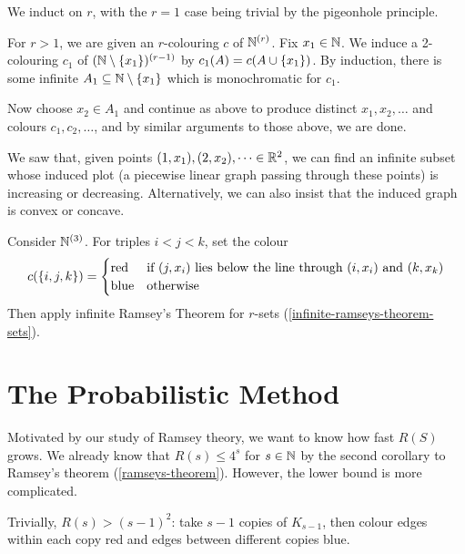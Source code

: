 \documentclass{article}
\begin{document}
\begin{prf}
    We induct on $r$, with the $r=1$ case being trivial by the pigeonhole principle.
    
    For $r > 1$, we are given an $r$-colouring $c$ of $\mathbb{N}^{(r)}$. Fix $x_1 \in \mathbb{N}$. We induce a 2-colouring $c_1$ of $(\mathbb{N} \setminus \left\lbrace x_1 \right\rbrace)^{(r-1)}$ by $c_1(A) = c(A \cup \left\lbrace x_1 \right\rbrace)$. By induction, there is some infinite $A_1 \subseteq \mathbb{N} \setminus \left\lbrace x_1 \right\rbrace$ which is monochromatic for $c_1$.
    
    Now choose $x_2 \in A_1$ and continue as above to produce distinct $x_1, x_2, \dots$ and colours $c_1, c_2, \dots$, and by similar arguments to those above, we are done.
\end{prf}

\begin{corollary}
    We saw that, given points $(1, x_1), (2, x_2), \dots \in \mathbb{R}^2$, we can find an infinite subset whose induced plot (a piecewise linear graph passing through these points) is increasing or decreasing. Alternatively, we can also insist that the induced graph is convex or concave.
\end{corollary}

\begin{prf}
    Consider $\mathbb{N}^{(3)}$. For triples $i < j < k$, set the colour
    \[
	c(\left\lbrace i,j,k \right\rbrace) = \begin{cases}
		\text{red} & \text{if $(j, x_i)$ lies below the line through $(i, x_i)$ and $(k, x_k)$} \\
		\text{blue} & \!\mathrel{\, \text{otherwise}}
	\end{cases}
	\]
	Then apply infinite Ramsey's Theorem for $r$-sets (\ref{infinite-ramseys-theorem-sets}).
\end{prf}


\pagebreak
\section{The Probabilistic Method}

Motivated by our study of Ramsey theory, we want to know how fast $R(S)$ grows. We already know that $R(s) \leq 4^s$ for $s \in \mathbb{N}$ by the second corollary to Ramsey's theorem (\ref{ramseys-theorem}). However, the lower bound is more complicated.

\begin{note}
	Trivially, $R(s) > (s-1)^2$: take $s-1$ copies of $K_{s-1}$, then colour edges within each copy red and edges between different copies blue.
\end{note}
\end{document}
